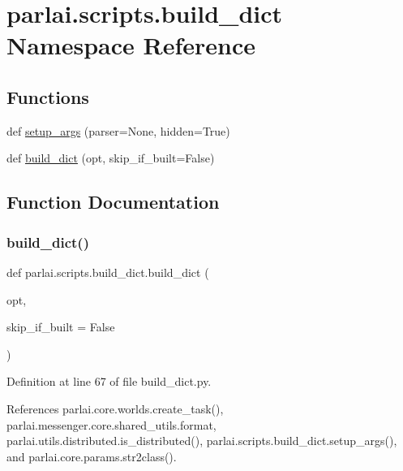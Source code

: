 \hypertarget{namespaceparlai_1_1scripts_1_1build__dict}{}\section{parlai.\+scripts.\+build\+\_\+dict Namespace Reference}
\label{namespaceparlai_1_1scripts_1_1build__dict}
\subsection*{Functions}
\begin{DoxyCompactItemize}
\item 
def \hyperlink{namespaceparlai_1_1scripts_1_1build__dict_a01e78707ace903aa772ada53fafe7067}{setup\+\_\+args} (parser=None, hidden=True)
\item 
def \hyperlink{namespaceparlai_1_1scripts_1_1build__dict_a3a0381817d7188331ee38b4a4627dbe0}{build\+\_\+dict} (opt, skip\+\_\+if\+\_\+built=False)
\end{DoxyCompactItemize}


\subsection{Function Documentation}
\mbox{\label{namespaceparlai_1_1scripts_1_1build__dict_a3a0381817d7188331ee38b4a4627dbe0}} 
\subsubsection{\texorpdfstring{build\+\_\+dict()}{build\_dict()}}
{\footnotesize\ttfamily def parlai.\+scripts.\+build\+\_\+dict.\+build\+\_\+dict (\begin{DoxyParamCaption}\item[{}]{opt,  }\item[{}]{skip\+\_\+if\+\_\+built = {\ttfamily False} }\end{DoxyParamCaption})}



Definition at line 67 of file build\+\_\+dict.\+py.



References parlai.\+core.\+worlds.\+create\+\_\+task(), parlai.\+messenger.\+core.\+shared\+\_\+utils.\+format, parlai.\+utils.\+distributed.\+is\+\_\+distributed(), parlai.\+scripts.\+build\+\_\+dict.\+setup\+\_\+args(), and parlai.\+core.\+params.\+str2class().

